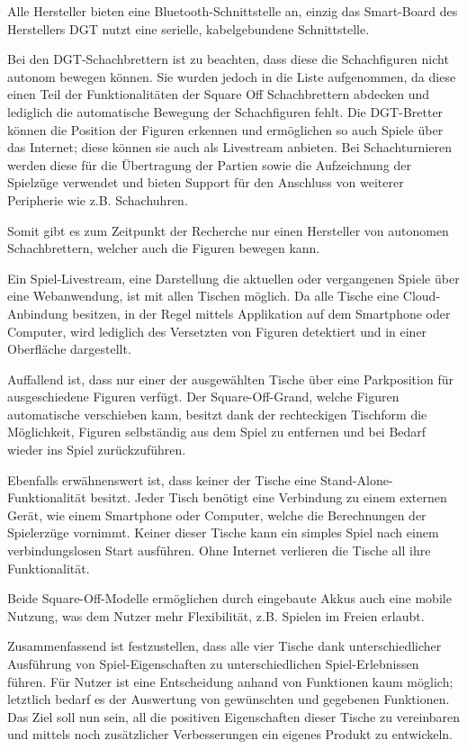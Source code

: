 Alle Hersteller bieten eine Bluetooth-Schnittstelle an, einzig das
Smart-Board des Herstellers DGT nutzt eine serielle, kabelgebundene
Schnittstelle.

Bei den DGT-Schachbrettern ist zu beachten, dass diese die Schachfiguren
nicht autonom bewegen können. Sie wurden jedoch in die Liste
aufgenommen, da diese einen Teil der Funktionalitäten der Square Off
Schachbrettern abdecken und lediglich die automatische Bewegung der
Schachfiguren fehlt. Die DGT-Bretter können die Position der Figuren
erkennen und ermöglichen so auch Spiele über das Internet; diese können
sie auch als Livestream anbieten. Bei Schachturnieren werden diese für
die Übertragung der Partien sowie die Aufzeichnung der Spielzüge
verwendet und bieten Support für den Anschluss von weiterer Peripherie
wie z.B. Schachuhren.

Somit gibt es zum Zeitpunkt der Recherche nur einen Hersteller von
autonomen Schachbrettern, welcher auch die Figuren bewegen kann.

Ein Spiel-Livestream, eine Darstellung die aktuellen oder vergangenen
Spiele über eine Webanwendung, ist mit allen Tischen möglich. Da alle
Tische eine Cloud-Anbindung besitzen, in der Regel mittels Applikation
auf dem Smartphone oder Computer, wird lediglich des Versetzten von
Figuren detektiert und in einer Oberfläche dargestellt.

Auffallend ist, dass nur einer der ausgewählten Tische über eine
Parkposition für ausgeschiedene Figuren verfügt. Der Square-Off-Grand,
welche Figuren automatische verschieben kann, besitzt dank der
rechteckigen Tischform die Möglichkeit, Figuren selbständig aus dem
Spiel zu entfernen und bei Bedarf wieder ins Spiel zurückzuführen.

Ebenfalls erwähnenswert ist, dass keiner der Tische eine
Stand-Alone-Funktionalität besitzt. Jeder Tisch benötigt eine Verbindung
zu einem externen Gerät, wie einem Smartphone oder Computer, welche die
Berechnungen der Spielerzüge vornimmt. Keiner dieser Tische kann ein
simples Spiel nach einem verbindungslosen Start ausführen. Ohne Internet
verlieren die Tische all ihre Funktionalität.

Beide Square-Off-Modelle ermöglichen durch eingebaute Akkus auch eine
mobile Nutzung, was dem Nutzer mehr Flexibilität, z.B. Spielen im Freien
erlaubt.

Zusammenfassend ist festzustellen, dass alle vier Tische dank
unterschiedlicher Ausführung von Spiel-Eigenschaften zu
unterschiedlichen Spiel-Erlebnissen führen. Für Nutzer ist eine
Entscheidung anhand von Funktionen kaum möglich; letztlich bedarf es der
Auswertung von gewünschten und gegebenen Funktionen. Das Ziel soll nun
sein, all die positiven Eigenschaften dieser Tische zu vereinbaren und
mittels noch zusätzlicher Verbesserungen ein eigenes Produkt zu
entwickeln.

